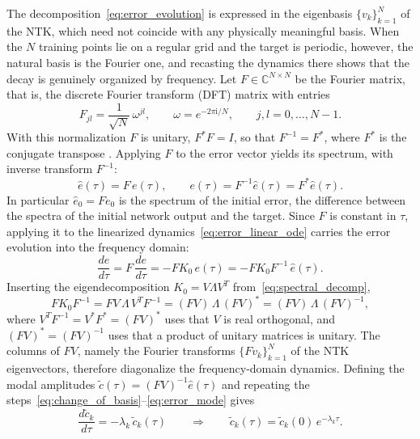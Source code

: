The decomposition~\eqref{eq:error_evolution} is expressed in the eigenbasis $\{v_k\}_{k=1}^{N}$ of the NTK, which need not coincide with any physically meaningful basis. When the $N$ training points lie on a regular grid and the target is periodic, however, the natural basis is the Fourier one, and recasting the dynamics there shows that the decay is genuinely organized by frequency. Let $F \in \mathbb{C}^{N \times N}$ be the Fourier matrix, that is, the discrete Fourier transform (DFT) matrix with entries
\begin{equation}\label{eq:dft_matrix}
    F_{jl} = \frac{1}{\sqrt{N}}\,\omega^{jl}, \qquad \omega = e^{-2\pi \mathrm{i}/N}, \qquad j,l = 0,\ldots,N-1.
\end{equation}
With this normalization $F$ is unitary, $F^{*}F = I$, so that $F^{-1} = F^{*}$, where $F^{*}$ is the conjugate transpose \parencite{golub2013, strang2006}. Applying $F$ to the error vector yields its spectrum, with inverse transform $F^{-1}$:
\begin{equation}\label{eq:dft_error}
    \hat e(\tau) = F\,e(\tau), \qquad e(\tau) = F^{-1}\hat e(\tau) = F^{*}\hat e(\tau).
\end{equation}
In particular $\hat e_0 = F e_0$ is the spectrum of the initial error, the difference between the spectra of the initial network output and the target. Since $F$ is constant in $\tau$, applying it to the linearized dynamics~\eqref{eq:error_linear_ode} carries the error evolution into the frequency domain:
\begin{equation}\label{eq:fourier_dynamics}
    \frac{d\hat e}{d\tau}
    = F\,\frac{de}{d\tau}
    = -F K_0\,e(\tau)
    = -F K_0 F^{-1}\,\hat e(\tau).
\end{equation}
Inserting the eigendecomposition $K_0 = V\Lambda V^T$ from~\eqref{eq:spectral_decomp},
\begin{equation}\label{eq:fourier_diag}
    F K_0 F^{-1}
    = F V\,\Lambda\,V^T F^{-1}
    = (FV)\,\Lambda\,(FV)^{*}
    = (FV)\,\Lambda\,(FV)^{-1},
\end{equation}
where $V^T F^{-1} = V^{*} F^{*} = (FV)^{*}$ uses that $V$ is real orthogonal, and $(FV)^{*} = (FV)^{-1}$ uses that a product of unitary matrices is unitary. The columns of $FV$, namely the Fourier transforms $\{F v_k\}_{k=1}^{N}$ of the NTK eigenvectors, therefore diagonalize the frequency-domain dynamics. Defining the modal amplitudes $\tilde c(\tau) = (FV)^{-1}\hat e(\tau)$ and repeating the steps~\eqref{eq:change_of_basis}--\eqref{eq:error_mode} gives
\begin{equation}\label{eq:fourier_mode}
    \frac{d\tilde c_k}{d\tau} = -\lambda_k\,\tilde c_k(\tau)
    \qquad\Longrightarrow\qquad
    \tilde c_k(\tau) = \tilde c_k(0)\,e^{-\lambda_k\tau}.
\end{equation}
